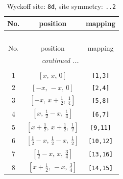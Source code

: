 \documentclass[fleqn,8pt]{jsarticle}
\begin{document}
\begin{longtable}{ccc}
\caption{Wyckoff site: {\tt 8d}, site symmetry: {\tt ..2}}
 \\
 \hline \hline
No. & position & mapping \\ \hline \endfirsthead

\multicolumn{2}{l}{\tablename\ \thetable{}} \\
 \hline \hline
No. & position & mapping \\ \hline \endhead

 \hline \hline
\multicolumn{2}{r}{\footnotesize\it continued ...} \\ \endfoot

 \hline \hline
\multicolumn{2}{r}{} \\ \endlastfoot

1 & $\left[ x,\, x,\, 0 \right]$ & {\tt [1,3]} \\ \hline
2 & $\left[ - x,\, - x,\, 0 \right]$ & {\tt [2,4]} \\ \hline
3 & $\left[ - x,\, x + \frac{1}{2},\, \frac{1}{4} \right]$ & {\tt [5,8]} \\ \hline
4 & $\left[ x,\, \frac{1}{2} - x,\, \frac{1}{4} \right]$ & {\tt [6,7]} \\ \hline
5 & $\left[ x + \frac{1}{2},\, x + \frac{1}{2},\, \frac{1}{2} \right]$ & {\tt [9,11]} \\ \hline
6 & $\left[ \frac{1}{2} - x,\, \frac{1}{2} - x,\, \frac{1}{2} \right]$ & {\tt [10,12]} \\ \hline
7 & $\left[ \frac{1}{2} - x,\, x,\, \frac{3}{4} \right]$ & {\tt [13,16]} \\ \hline
8 & $\left[ x + \frac{1}{2},\, - x,\, \frac{3}{4} \right]$ & {\tt [14,15]} \\
\end{longtable}
\renewcommand{\arraystretch}{1.2}
\end{document}
